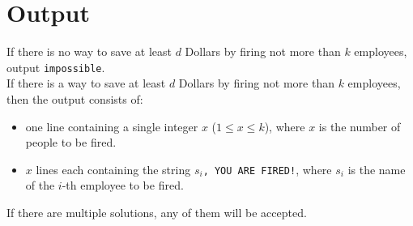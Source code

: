 \section*{Output}
If there is no way to save at least $d$ Dollars by firing not more than $k$ employees, output \texttt{impossible}.\\
If there is a way to save at least $d$ Dollars by firing not more than $k$ employees, then the output consists of:
\begin{itemize}
	\item one line containing a single integer $x$ ($1 \le x \le k$), where $x$ is the number of people to be fired.
	\item $x$ lines each containing the string $s_i$\texttt{, YOU ARE FIRED!}, where $s_i$ is the name of the $i$-th employee to be fired.
\end{itemize}
If there are multiple solutions, any of them will be accepted.\\
